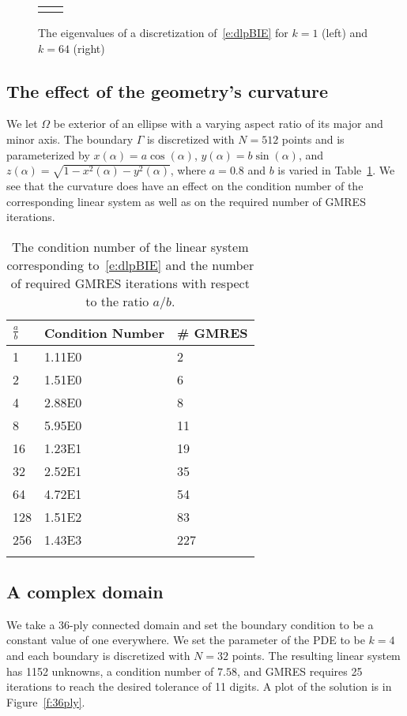 \begin{figure}[htps]
\centering
\begin{tabular}{cc}
 &

\end{tabular}
\caption{\label{f:evalues} The eigenvalues of a discretization
of~\eqref{e:dlpBIE} for $k=1$ (left) and $k=64$ (right)}
\end{figure}


\subsection{The effect of the geometry's curvature}
We let $\Omega$ be exterior of an ellipse with a varying aspect ratio
of its major and minor axis.  The boundary $\Gamma$ is discretized with
$N=512$ points and is parameterized by $x(\alpha) = a\cos(\alpha)$,
$y(\alpha) = b\sin(\alpha)$, and $z(\alpha) =
\sqrt{1-x^{2}(\alpha)-y^{2}(\alpha)}$, where $a = 0.8$ and $b$ is
varied in Table~\ref{t:example3}.  We see that the curvature does have
an effect on the condition number of the corresponding linear system as
well as on the required number of GMRES iterations.

\begin{table}[htps]
\caption{\label{t:example3} The condition number of the linear system
corresponding to~\eqref{e:dlpBIE} and the number of required GMRES
iterations with respect to the ratio $a/b$.}
\centering
\begin{tabular*}{0.8\textwidth}{@{\extracolsep{\fill}}lll}
$\frac{a}{b}$ & Condition Number & \# GMRES \\
\hline\noalign{\smallskip}
1   & 1.11E0 & 2   \\ 
2   & 1.51E0 & 6   \\
4   & 2.88E0 & 8   \\
8   & 5.95E0 & 11  \\
16  & 1.23E1 & 19  \\
32  & 2.52E1 & 35  \\
64  & 4.72E1 & 54  \\
128 & 1.51E2 & 83  \\
256 & 1.43E3 & 227 \\
\noalign{\smallskip}\hline
\end{tabular*}
\end{table}


\subsection{A complex domain}
We take a 36-ply connected domain and set the boundary condition to be a
constant value of one everywhere.  We set the parameter of the PDE to be
$k=4$ and each boundary is discretized with $N=32$ points.  The
resulting linear system has 1152 unknowns, a condition number of $7.58$,
and GMRES requires 25 iterations to reach the desired tolerance of 11
digits.  A plot of the solution is in Figure~\ref{f:36ply}.


